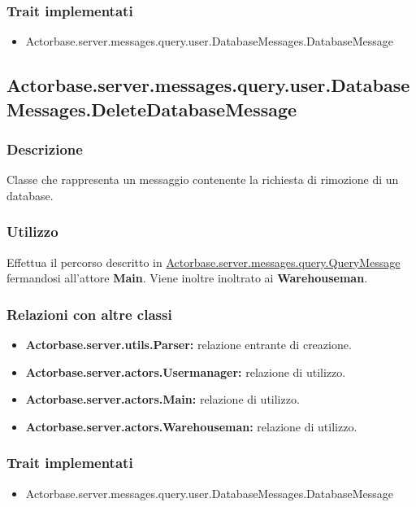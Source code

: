 \documentclass[a4paper]{article}
\begin{document}
			\subsubsection{Trait implementati}
				\begin{itemize}
					\item Actorbase.server.messages.query.user.DatabaseMessages.DatabaseMessage
				\end{itemize}
				
		\subsection{Actorbase.server.messages.query.user.DatabaseMessages.DeleteDatabaseMessage}
			\subsubsection{Descrizione}
				Classe che rappresenta un messaggio contenente la richiesta di rimozione di un database.
				
			\subsubsection{Utilizzo}
				Effettua il percorso descritto in \hyperref[QueryMessage]{Actorbase.server.messages.query.QueryMessage} fermandosi all'attore \textbf{Main}.
				Viene inoltre inoltrato ai \textbf{Warehouseman}.
				
			\subsubsection{Relazioni con altre classi}
				\begin{itemize}
					\item \textbf{Actorbase.server.utils.Parser:} relazione entrante di creazione.
					\item \textbf{Actorbase.server.actors.Usermanager:} relazione di utilizzo.
					\item \textbf{Actorbase.server.actors.Main:} relazione di utilizzo.
					\item \textbf{Actorbase.server.actors.Warehouseman:} relazione di utilizzo.
				\end{itemize}
			\subsubsection{Trait implementati}
				\begin{itemize}
					\item Actorbase.server.messages.query.user.DatabaseMessages.DatabaseMessage
				\end{itemize}
				
\end{document}
